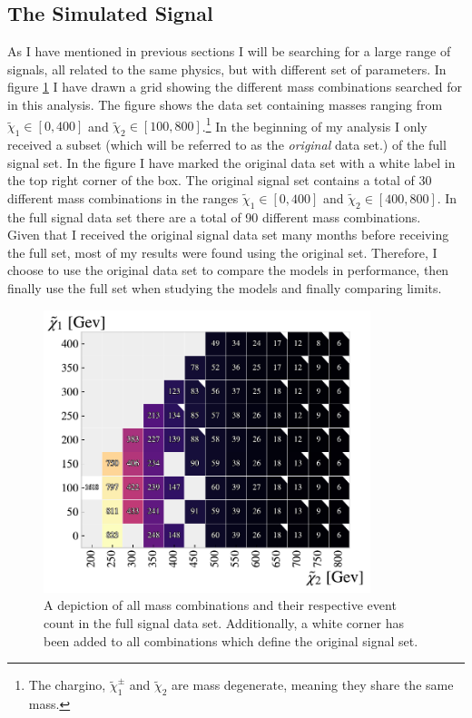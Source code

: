 \subsection{The Simulated Signal}\label{subsec:signal}
As I have mentioned in previous sections I will be searching for a large range of signals, all related to the same
physics, but with different set of parameters. In figure \ref{fig:nrSignal} I have drawn a grid showing the different mass combinations 
searched for in this analysis. The figure shows the data set containing masses ranging from ${\tilde{\chi}_1}\in[0,400]$
and ${\tilde{\chi}_2}\in[100,800]$.\footnote{The chargino, $\tilde{\chi}^{\pm}_1$ and $\tilde{\chi}_2$ are mass degenerate, 
meaning they share the same mass.} In the beginning of my analysis I only received a subset (which will be referred to as the 
\emph{original} data set.) of the full signal set. In the figure I have marked the original data set with a white label in the top 
right corner of the box. The original signal set contains a total of 30 different mass combinations in the ranges 
${\tilde{\chi}_1}\in[0,400]$ and ${\tilde{\chi}_2}\in[400,800]$. In the full signal data set there are a total of 90 different 
mass combinations.
\\
Given that I received the original signal data set many months before receiving the full set, most of my results were found using the 
original set. Therefore, I choose to use the original data set to compare the models in performance, then finally use the full set 
when studying the models and finally comparing limits.
\begin{figure}
  \centering
  \includegraphics[width=0.85\textwidth]{Figures/MLResults/NN/SUSY/Grid/NrSignalEvents.pdf}
  \caption{A depiction of all mass combinations and their respective event count in the full signal data set.
  Additionally, a white corner has been added to all combinations which define the original signal set.}
  \label{fig:nrSignal}
\end{figure}
